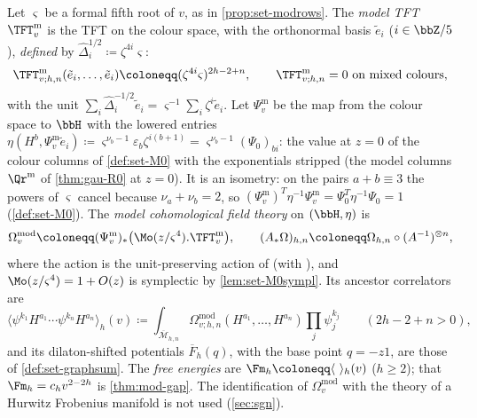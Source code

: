 
\begin{defn}
\label{def:set-modcohft}
Let $\varsigma$ be a formal fifth root of $v$, as in \cref{prop:set-modrows}. The \emph{model TFT} $\TFT^{\mathrm m}_v$ is the TFT on the colour space, with the orthonormal basis $\tilde e_i$ ($i\in\bbZ/5$), \emph{defined} by $\hat\Delta_i^{1/2}\coloneqq\zeta^{4i}\varsigma$:
\[
\TFT^{\mathrm m}_{v;h,n}(\tilde e_i,\dots,\tilde e_i)\coloneqq(\zeta^{4i}\varsigma)^{2h-2+n},\qquad\TFT^{\mathrm m}_{v;h,n}=0\text{ on mixed colours},
\]
with the unit $\sum_i\hat\Delta_i^{-1/2}\tilde e_i=\varsigma^{-1}\sum_i\zeta^i\tilde e_i$. Let $\Psi^{\mathrm m}_v$ be the map from the colour space to $\bbH$ with the lowered entries $\eta(H^b,\Psi^{\mathrm m}_v\tilde e_i)\coloneqq\varsigma^{\nu_b-1}\varepsilon_b\zeta^{i(b+1)}=\varsigma^{\nu_b-1}(\Psi_0)_{bi}$: the value at $z=0$ of the colour columns of \cref{def:set-M0} with the exponentials stripped (the model columns $\Qr^{\mathrm m}$ of \cref{thm:gau-R0} at $z=0$). It is an isometry: on the pairs $a+b\equiv3$ the powers of $\varsigma$ cancel because $\nu_a+\nu_b=2$, so $(\Psi^{\mathrm m}_v)^T\eta^{-1}\Psi^{\mathrm m}_v=\Psi_0^T\eta^{-1}\Psi_0=1$ (\cref{def:set-M0}). The \emph{model cohomological field theory} on $(\bbH,\eta)$ is
\[
\Omega^{\mathrm{mod}}_v\coloneqq(\Psi^{\mathrm m}_v)_*\bigl(\Mo(z/\varsigma^4).\TFT^{\mathrm m}_v\bigr),\qquad(A_*\Omega)_{h,n}\coloneqq\Omega_{h,n}\circ(A^{-1})^{\otimes n},
\]
where the action is the unit-preserving action of \cite[Def.~2.13]{PPZ15} (with \cite[Def.~2.5]{PPZ15}), and $\Mo(z/\varsigma^4)=1+O(z)$ is symplectic by \cref{lem:set-M0sympl}. Its ancestor correlators are
\[
\langle\psi^{k_1}H^{a_1}\cdots\psi^{k_n}H^{a_n}\rangle_h(v)\coloneqq\int_{\overline{\mathcal M}_{h,n}}\Omega^{\mathrm{mod}}_{v;h,n}(H^{a_1},\dots,H^{a_n})\prod_j\psi_j^{k_j}\qquad(2h-2+n>0),
\]
and its dilaton-shifted potentials $\overline F_h(q)$, with the base point $q=-z1$, are those of \cref{def:set-graphsum}. The \emph{free energies} are $\Fm_h\coloneqq\langle\ \rangle_h(v)$ ($h\geq2$); that $\Fm_h=c_hv^{2-2h}$ is \cref{thm:mod-gap}. The identification of $\Omega^{\mathrm{mod}}_v$ with the theory of a Hurwitz Frobenius manifold is not used (\cref{sec:sgn}).
\end{defn}

